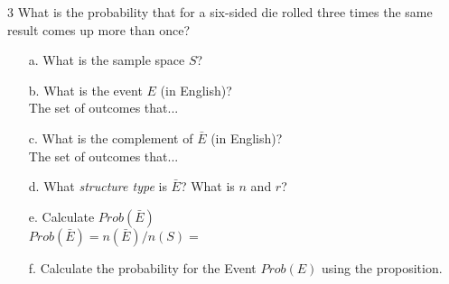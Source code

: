 \documentclass[a4paper,12pt]{book}
\newcounter{question}
\begin{document}
        \begin{question}{\thequestion}{3}
            What is the probability that for a six-sided die rolled
            three times the same result comes up more than once?

            \begin{enumerate}
                \item[a.] What is the sample space $S$?

                \item[b.] What is the event $E$ (in English)? ~\\
                    The set of outcomes that... 

                \item[c.] What is the complement of $\bar{E}$ (in English)? ~\\
                    The set of outcomes that... 

                \item[d.] What \textit{structure type} is $\bar{E}$? What is $n$ and $r$? ~\\

                \item[e.] Calculate $Prob(\bar{E})$ ~\\
                    $Prob(\bar{E}) = n(\bar{E}) / n(S) =$

                \item[f.] Calculate the probability for the Event $Prob(E)$ using the proposition. ~\\
            \end{enumerate}
        \end{question}
\end{document}
